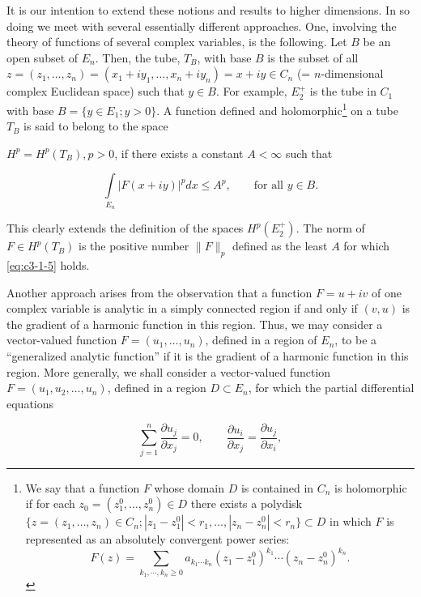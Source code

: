It is our intention to extend these notions and results to higher dimensions. In so doing we meet with several essentially different approaches. One, involving the theory of functions of several complex variables, is the following. Let $B$ be an open subset of $E_n$. Then, the tube, $T_B$, with base $B$ is the subset of all $z = (z_1, \ldots, z_n) = (x_1 + iy_1, \ldots, x_n + iy_n) = x + iy \in C_n$ (= $n$-dimensional complex Euclidean space) such that $y \in B$. For example, $E_2^+$ is the tube in $C_1$ with base $B = \{y \in E_1; y > 0\}$. A function defined and holomorphic\footnote{We say that a function $F$ whose domain $D$ is contained in $C_n$ is holomorphic if for each $z_0 = (z_1^0, \ldots, z_n^0) \in D$ there exists a polydisk $\{z = (z_1, \ldots, z_n) \in C_n ; |z_1 - z_1^0| < r_1, \ldots, |z_n - z_n^0| < r_n\} \subset D$ in which $F$ is represented as an absolutely convergent power series: 
\[
F(z)=\sum_{k_{1},\cdots,k_{n}\geq0}a_{k_{1}\cdots k_{n}}(z_{1}-z_{1}^{0})^{k_{1}}\cdots(z_{n}-z_{n}^{0})^{k_{n}}.
\]} on a tube $T_B$ is said to belong to the space

$H^p = H^p(T_B), p > 0$, if there exists a constant $A < \infty$ such that

\begin{equation}\label{eq:c3-1-5}
\int\limits_{E_{n}}|F(x+i y)|^{p}d x\leq A^{p},\qquad\text{for all }y\in B.
\end{equation}

This clearly extends the definition of the spaces $H^p(E_2^+)$. The norm of $F \in H^p(T_B)$ is the positive number $\|F\|_p$ defined as the least $A$ for which \eqref{eq:c3-1-5} holds.

Another approach arises from the observation that a function $F = u + iv$ of one complex variable is analytic in a simply connected region if and only if $(v, u)$ is the gradient of a harmonic function in this region. Thus, we may consider a vector-valued function $F = (u_1, \ldots, u_n)$, defined in a region of $E_n$, to be a ``generalized analytic function'' if it is the gradient of a harmonic function in this region. More generally, we shall consider a vector-valued function $F = (u_1, u_2, \ldots, u_n)$, defined in a region $D \subset E_n$, for which the partial differential equations

\begin{equation}\label{eq:c3-1-6}
\sum_{j=1}^{n}\frac{\partial u_{j}}{\partial x_{j}}=0,\qquad\frac{\partial u_{i}}{\partial x_{j}}=\frac{\partial u_{j}}{\partial x_{i}},
\end{equation}

